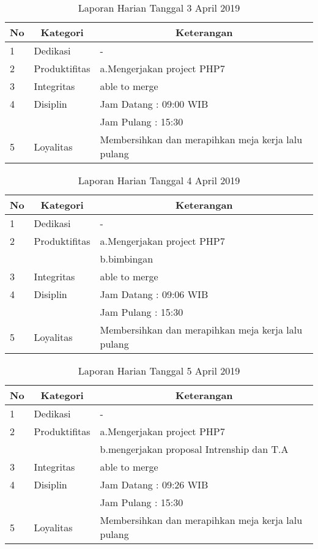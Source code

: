 \begin{table}[htp]
\caption{Laporan Harian Tanggal 3 April 2019}
\label{tab:lh030419}
\begin{tabular}{|l|l|l|}
\hline
\textbf{No} & \multicolumn{1}{c|}{\textbf{Kategori}} & \multicolumn{1}{c|}{\textbf{Keterangan}} \\ \hline
1 & Dedikasi & - \\ \hline
2 & Produktifitas & a.Mengerjakan project PHP7 \\
3 & Integritas & able to merge \\ \hline
4 & Disiplin & Jam Datang : 09:00 WIB \\
   &  & Jam Pulang : 15:30 \\ \hline
5 & Loyalitas & Membersihkan dan merapihkan meja kerja lalu pulang \\ \hline
\end{tabular}
\end{table}

\begin{table}[htp]
\caption{Laporan Harian Tanggal 4 April 2019}
\label{tab:lh040419}
\begin{tabular}{|l|l|l|}
\hline
\textbf{No} & \multicolumn{1}{c|}{\textbf{Kategori}} & \multicolumn{1}{c|}{\textbf{Keterangan}} \\ \hline
1 & Dedikasi & - \\ \hline
2 & Produktifitas & a.Mengerjakan project PHP7 \\
& & b.bimbingan \\ \hline
3 & Integritas & able to merge \\ \hline
4 & Disiplin & Jam Datang : 09:06 WIB \\
   &  & Jam Pulang : 15:30 \\ \hline
5 & Loyalitas & Membersihkan dan merapihkan meja kerja lalu pulang \\ \hline
\end{tabular}
\end{table}

\begin{table}[htp]
\caption{Laporan Harian Tanggal 5 April 2019}
\label{tab:lh050419}
\begin{tabular}{|l|l|l|}
\hline
\textbf{No} & \multicolumn{1}{c|}{\textbf{Kategori}} & \multicolumn{1}{c|}{\textbf{Keterangan}} \\ \hline
1 & Dedikasi & - \\ \hline
2 & Produktifitas & a.Mengerjakan project PHP7 \\
   & & b.mengerjakan proposal Intrenship dan T.A \\ \hline
3 & Integritas & able to merge \\ \hline
4 & Disiplin & Jam Datang : 09:26 WIB \\
   &  & Jam Pulang : 15:30 \\ \hline
5 & Loyalitas & Membersihkan dan merapihkan meja kerja lalu pulang \\ \hline
\end{tabular}
\end{table}



